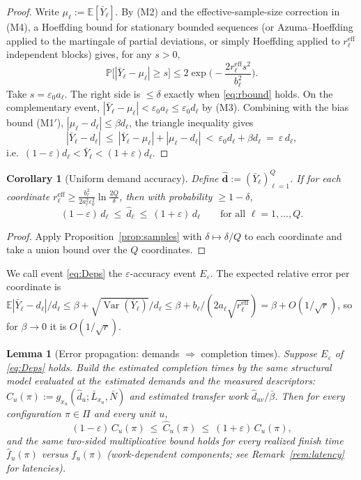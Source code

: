 \documentclass{amsart}
\newtheorem{lemma}{Lemma}
\newtheorem{corollary}{Corollary}
\theoremstyle{definition}
\newcommand{\Chat}{\widehat{C}}
\newcommand{\E}{\mathbb{E}}
\renewcommand{\Pr}{\mathbb{P}}
\begin{document}
\begin{proof}
Write $\mu_\ell:=\E[\bar Y_\ell]$. By (M2) and the effective-sample-size
correction in (M4), a Hoeffding bound for stationary bounded sequences (or
Azuma--Hoeffding applied to the martingale of partial deviations, or simply
Hoeffding applied to $r_\ell^{\mathrm{eff}}$ independent blocks) gives, for any
$s>0$,
\[
\Pr\big[|\bar Y_\ell-\mu_\ell|\ge s\big]\le 2\exp\!\Big(-\frac{2 r_\ell^{\mathrm{eff}} s^2}{b_\ell^2}\Big).
\]
Take $s=\varepsilon_0 a_\ell$. The right side is $\le\delta$ exactly when
\eqref{eq:rbound} holds. On the complementary event,
$|\bar Y_\ell-\mu_\ell|<\varepsilon_0 a_\ell\le\varepsilon_0 d_\ell$ by (M3).
Combining with the bias bound (M1$'$), $|\mu_\ell-d_\ell|\le\beta d_\ell$, the
triangle inequality gives
\[
|\bar Y_\ell-d_\ell|\ \le\ |\bar Y_\ell-\mu_\ell|+|\mu_\ell-d_\ell|
\ <\ \varepsilon_0 d_\ell+\beta d_\ell\ =\ \varepsilon\, d_\ell,
\]
i.e.\ $(1-\varepsilon)d_\ell<\bar Y_\ell<(1+\varepsilon)d_\ell$.
\end{proof}

\begin{corollary}[Uniform demand accuracy]\label{cor:uniform}
Define $\widehat{\mathbf d}:=(\bar Y_\ell)_{\ell=1}^Q$. If for each coordinate
$r_\ell^{\mathrm{eff}}\ge\frac{b_\ell^2}{2a_\ell^2\varepsilon_0^2}\ln\frac{2Q}{\delta}$,
then with probability $\ge1-\delta$,
\begin{equation}\label{eq:Deps}
(1-\varepsilon)\,d_\ell\ \le\ \widehat d_\ell\ \le\ (1+\varepsilon)\,d_\ell
\qquad\text{for all }\ell=1,\dots,Q.
\end{equation}
\end{corollary}

\begin{proof}
Apply Proposition~\ref{prop:samples} with $\delta\mapsto\delta/Q$ to each
coordinate and take a union bound over the $Q$ coordinates.
\end{proof}

We call event \eqref{eq:Deps} the $\varepsilon$-accuracy event $E_\varepsilon$.
The expected relative error per coordinate is
$\E|\bar Y_\ell-d_\ell|/d_\ell\le\beta+\sqrt{\operatorname{Var}(\bar Y_\ell)}/d_\ell
\le\beta+b_\ell/(2a_\ell\sqrt{r_\ell^{\mathrm{eff}}})=\beta+O(1/\sqrt r)$,
so for $\beta\to0$ it is $O(1/\sqrt r)$.

\begin{lemma}[Error propagation: demands $\Rightarrow$ completion times]\label{lem:propagate}
Suppose $E_\varepsilon$ of \eqref{eq:Deps} holds. Build the estimated
completion times by the \emph{same} structural model evaluated at the estimated
demands and the measured descriptors:
$\Chat_u(\pi):=g_{x_u}(\widehat d_u;\bar L_{x_u},\bar N)$ and estimated transfer
work $\widehat d_{uv}/\bar\beta$. Then for every configuration $\pi\in\Pi$ and
every unit $u$,
\begin{equation}\label{eq:Ceps}
(1-\varepsilon)\,C_u(\pi)\ \le\ \Chat_u(\pi)\ \le\ (1+\varepsilon)\,C_u(\pi),
\end{equation}
and the same two-sided multiplicative bound holds for every realized finish
time $\widehat f_u(\pi)$ versus $f_u(\pi)$ (work-dependent components; see
Remark~\ref{rem:latency} for latencies).
\end{lemma}
\end{document}

